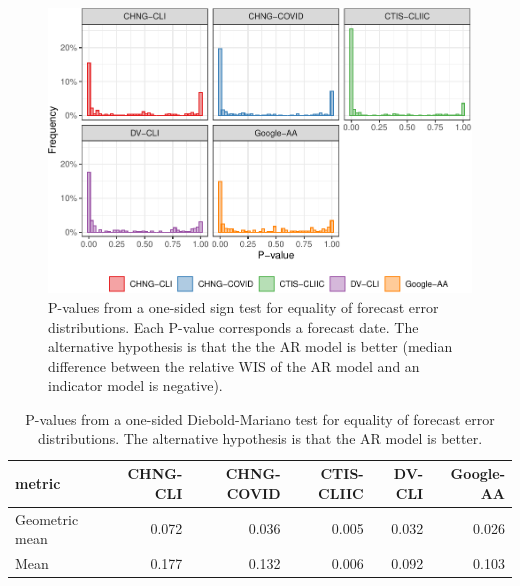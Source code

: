 \documentclass[9pt,twoside,lineno]{pnas-new}
\begin{document}
\begin{figure}

{\centering \includegraphics[width=\textwidth]{fig/sign-test-1} 

}

\caption{P-values from a one-sided sign test for equality of forecast error distributions. Each P-value corresponds a forecast date. The alternative hypothesis is that the the AR model is better (median difference between the relative WIS of the AR model and an indicator model is negative).}\label{fig:sign-test}
\end{figure}

\begin{table}

\caption{\label{tab:dm-test}P-values from a one-sided Diebold-Mariano test for equality of forecast error distributions. The alternative hypothesis is that the AR model is better.}
\centering
\begin{tabular}[t]{lrrrrr}
\toprule
metric & CHNG-CLI & CHNG-COVID & CTIS-CLIIC & DV-CLI & Google-AA\\
\midrule
Geometric mean & 0.072 & 0.036 & 0.005 & 0.032 & 0.026\\
Mean & 0.177 & 0.132 & 0.006 & 0.092 & 0.103\\
\bottomrule
\end{tabular}
\end{table}
\end{document}
